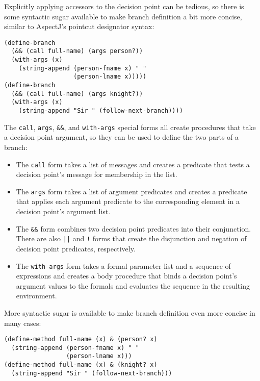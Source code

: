 \documentclass{acm_proc_article-sp}
\newcommand{\code}[1]{\texttt{#1}}
\begin{document}
Explicitly applying accessors to the decision point can be tedious, so
there is some syntactic sugar available to make branch definition a
bit more concise, similar to AspectJ's pointcut designator syntax:

\begin{verbatim}
(define-branch
  (&& (call full-name) (args person?))
  (with-args (x)
    (string-append (person-fname x) " "
                   (person-lname x)))))
(define-branch
  (&& (call full-name) (args knight?))
  (with-args (x)
    (string-append "Sir " (follow-next-branch))))
\end{verbatim}

The \code{call}, \code{args}, \code{\&\&}, and \code{with-args}
special forms all create procedures that take a decision point
argument, so they can be used to define the two parts of a branch:
\begin{itemize}
\item The \code{call} form takes a list of messages and creates a
      predicate that tests a decision point's message for membership
      in the list.
\item The \code{args} form takes a list of argument predicates and
      creates a predicate that applies each argument predicate to the
      corresponding element in a decision point's argument list.
\item The \code{\&\&} form combines two decision point predicates into their
      conjunction.  There are also \code{||} and \code{!} forms that
      create the disjunction and negation of decision point
      predicates, respectively.
\item The \code{with-args} form takes a formal parameter list and a
      sequence of expressions and creates a body procedure that binds
      a decision point's argument values to the formals and evaluates
      the sequence in the resulting environment.
\end{itemize}

More syntactic sugar is available to make branch definition even
more concise in many cases:

\begin{verbatim}
(define-method full-name (x) & (person? x)
  (string-append (person-fname x) " "
                 (person-lname x)))
(define-method full-name (x) & (knight? x)
  (string-append "Sir " (follow-next-branch)))
\end{verbatim}
\end{document}
